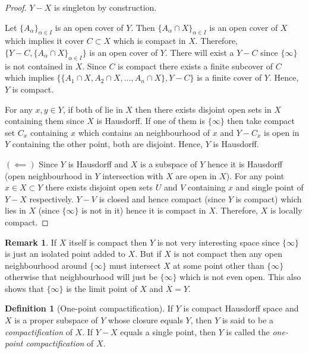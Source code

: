 \documentclass[12pt,reqno]{amsart}
\theoremstyle{plain}
\theoremstyle{definition}
\newtheorem{defn}{Definition}
\newtheorem{rem}{Remark}
\begin{document}
\begin{proof}
    \noindent $Y - X$ is singleton by construction.

     Let $\{A_\alpha\}_{\alpha \in I}$ is an open cover of $Y$. Then $\{A_\alpha \cap X\}_{\alpha\in I}$ is an open cover of $X$ which implies it cover $C \subset X$ which is compact in $X$. Therefore, $\{Y - C, \{A_\alpha \cap X\}_{\alpha \in I}\}$ is an open cover of $Y$. There will exist a $Y - C$ since $\{\infty\}$ is not contained in $X$. Since $C$ is compact there exists a finite subcover of $C$ which implies $\{\{A_1 \cap X, A_2 \cap X, \dots, A_n \cap X\}, Y - C\}$ is a finite cover of $Y$. Hence, $Y$ is compact.

    \noindent For any $x,y \in Y$, if both of lie in $X$ then there exists disjoint open sets in $X$ containing them since $X$ is Hausdorff. If one of them is $\{\infty\}$ then take compact set $C_x$ containing $x$ which contains an neighbourhood of $x$ and $Y - C_x$ is open in $Y$ containing the other point, both are disjoint. Hence, $Y$ is Hausdorff.

    \noindent $(\impliedby)$ Since $Y$ is Hausdorff and $X$ is a subspace of $Y$ hence it is Hausdorff (open neighbourhood in $Y$ intersection with $X$ are open in $X$). For any point $x \in X \subset Y$ there exists disjoint open sets $U$ and $V$ containing $x$ and single point of $Y - X$ respectively. $Y - V$ is closed and hence compact (since $Y$ is compact) which lies in $X$ (since $\{\infty\}$ is not in it) hence it is compact in $X$. Therefore, $X$ is locally compact.
\end{proof}

\begin{rem}
    If $X$ itself is compact then $Y$ is not very interesting space since $\{\infty\}$ is just an isolated point added to $X$. But if $X$ is not compact then any open neighbourhood around $\{\infty\}$ must intersect $X$ at some point other than $\{\infty\}$ otherwise that neighbourhood will just be $\{\infty\}$ which is not even open. This also shows that $\{\infty\}$ is the limit point of $X$ and $\overline{X} = Y$.
\end{rem}

\begin{defn}[One-point compactification]
    If $Y$ is compact Hausdorff space and $X$ is a proper subspace of $Y$ whose closure equals $Y$, then $Y$ is said to be a {\it compactification} of $X$. If $Y-X$ equals a single point, then $Y$ is called the {\it one-point compactification} of $X$.
\end{defn}
\end{document}
